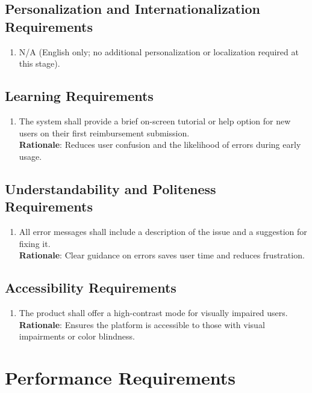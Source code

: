 \documentclass[12pt]{article}
\begin{document}
\subsection{Personalization and Internationalization Requirements}
\begin{enumerate}
  \item N/A (English only; no additional personalization or localization required at this stage).
\end{enumerate}

\subsection{Learning Requirements}
\begin{enumerate}
  \item The system shall provide a brief on-screen tutorial or help option for new users on their first reimbursement submission. \\
  \textbf{Rationale}: Reduces user confusion and the likelihood of errors during early usage.
\end{enumerate}

\subsection{Understandability and Politeness Requirements}
\begin{enumerate}
  \item All error messages shall include a description of the issue and a suggestion for fixing it. \\
  \textbf{Rationale}: Clear guidance on errors saves user time and reduces frustration.
\end{enumerate}

\subsection{Accessibility Requirements}
\begin{enumerate}
  \item The product shall offer a high-contrast mode for visually impaired users. \\
  \textbf{Rationale}: Ensures the platform is accessible to those with visual impairments or color blindness.
\end{enumerate}

\section{Performance Requirements}
\end{document}

